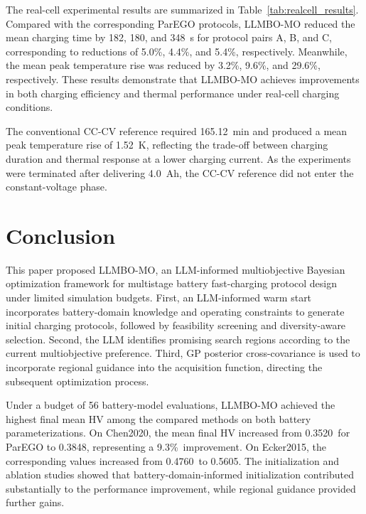 \documentclass[journal,10pt]{IEEEtran}
\newcommand{\ChenLLMBOMean}{0.3848}
\newcommand{\ChenParEGOMean}{0.3520}
\newcommand{\ChenFinalGain}{9.3\%}
\newcommand{\EckerParEGOMean}{0.4760}
\newcommand{\EckerLLMBOMean}{0.5605}
\begin{document}
The real-cell experimental results are summarized in
Table~\ref{tab:realcell_results}. Compared with the
corresponding ParEGO protocols, LLMBO-MO reduced the mean
charging time by 182, 180, and 348~s for protocol pairs
A, B, and C, corresponding to reductions of 5.0\%,
4.4\%, and 5.4\%, respectively. Meanwhile, the mean
peak temperature rise was reduced by 3.2\%, 9.6\%,
and 29.6\%, respectively. These results demonstrate
that LLMBO-MO achieves improvements in both charging
efficiency and thermal performance under real-cell
charging conditions.

The conventional CC-CV reference required 165.12~min
and produced a mean peak temperature rise of 1.52~K,
reflecting the trade-off between charging duration and
thermal response at a lower charging current. As the
experiments were terminated after delivering 4.0~Ah,
the CC-CV reference did not enter the constant-voltage
phase.



\section{Conclusion}
\label{sec:conclusion}

This paper proposed LLMBO-MO, an LLM-informed multiobjective
Bayesian optimization framework for multistage battery
fast-charging protocol design under limited simulation budgets.
First, an LLM-informed warm start incorporates battery-domain
knowledge and operating constraints to generate initial charging
protocols, followed by feasibility screening and diversity-aware
selection. Second, the LLM identifies promising search regions
according to the current multiobjective preference. Third,
GP posterior cross-covariance is used to incorporate regional
guidance into the acquisition function, directing the subsequent
optimization process.

Under a budget of 56 battery-model evaluations, LLMBO-MO
achieved the highest final mean HV among the compared methods
on both battery parameterizations. On Chen2020, the mean final
HV increased from \ChenParEGOMean\ for ParEGO to
\ChenLLMBOMean, representing a \ChenFinalGain\ improvement.
On Ecker2015, the corresponding values increased from
\EckerParEGOMean\ to \EckerLLMBOMean.
The initialization and ablation studies showed that
battery-domain-informed initialization contributed substantially
to the performance improvement, while regional guidance
provided further gains.
\end{document}
